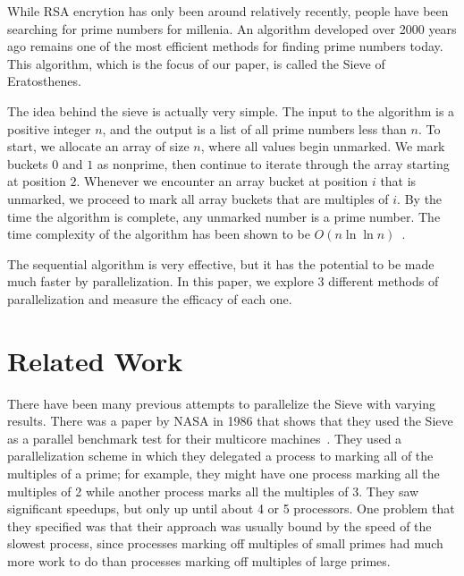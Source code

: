 \documentclass[11pt,twocolumn]{article}
\begin{document}
While RSA encrytion has only been around relatively recently, people
have been searching for prime numbers for millenia. An algorithm
developed over 2000 years ago remains one of the most efficient
methods for finding prime numbers today. This algorithm, which is the focus
of our paper, is called the Sieve of Eratosthenes.

The idea behind the sieve is actually very simple. The input to the
algorithm is a positive integer $n$, and the output is a list
of all prime numbers less than $n$. To start, we allocate an array
of size $n$, where all values begin unmarked. We mark buckets $0$ and
$1$ as nonprime, then continue to iterate through the array starting at 
position
$2$. Whenever we encounter an array bucket at position $i$ that is
unmarked, we proceed to mark all array buckets that are multiples
of $i$. By the time the algorithm is complete, any unmarked number
is a prime number. The time complexity of the algorithm has been
shown to be $O(n\ln{\ln{n}})$~\cite{Wirian}.

The sequential algorithm is very effective, but it has the potential
to be made much faster by parallelization. In this paper, we explore
3 different methods of parallelization and measure the efficacy of
each one.


\section {Related Work}\label{relwork}

There have been many previous attempts to parallelize the Sieve with
varying results. There was a paper by NASA in 1986 that shows that they
used the Sieve as a parallel benchmark test for their multicore
machines~\cite{Bohkari}.
They used a parallelization scheme in which they delegated a process to
marking all of the multiples of a prime; for example, they might have
one process marking all the multiples of 2 while another process marks
all the multiples of 3. They saw significant speedups, but only up until
about 4 or 5 processors. One problem that they specified was that their
approach was usually bound by the speed of the slowest process, since
processes marking off multiples of small primes had much more work
to do than processes marking off multiples of large primes.
\end{document}
